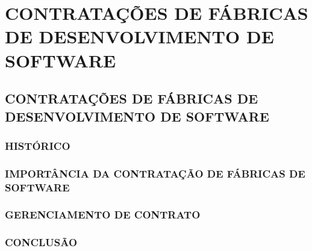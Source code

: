 \part{CONTRATAÇÕES DE FÁBRICAS DE DESENVOLVIMENTO DE SOFTWARE}

\chapter[Contratações de Fábricas de Desenvolvimento de Software]{CONTRATAÇÕES DE FÁBRICAS DE DESENVOLVIMENTO DE SOFTWARE}



\section[Histórico]{HISTÓRICO}

\section[Importância da Contração de Fábricas de Software]{IMPORTÂNCIA DA CONTRATAÇÃO DE FÁBRICAS DE SOFTWARE}

\section[Gerenciamento de Contrato]{GERENCIAMENTO DE CONTRATO}

\section[Conclusão]{CONCLUSÃO}

